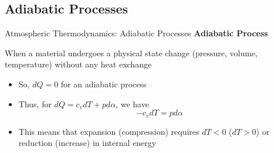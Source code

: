 \subsection{Adiabatic Processes}
\begin{frame}{Atmospheric Thermodynamics: Adiabatic Processes}
\textbf{Adiabatic Process}
\begin{fancydefs}
	When a material undergoes a physical state change (pressure, volume, temperature) without any heat exchange
\end{fancydefs}
\begin{itemize}
	\item So, $dQ=0$ for an adiabatic process
	\item Thus, for $dQ = c_vdT + pd\alpha$, we have
	$$-c_vdT = pd\alpha$$
	\item This means that expansion (compression) requires $dT<0$ ($dT>0$) or reduction (increase) in internal energy
\end{itemize}
\end{frame}

